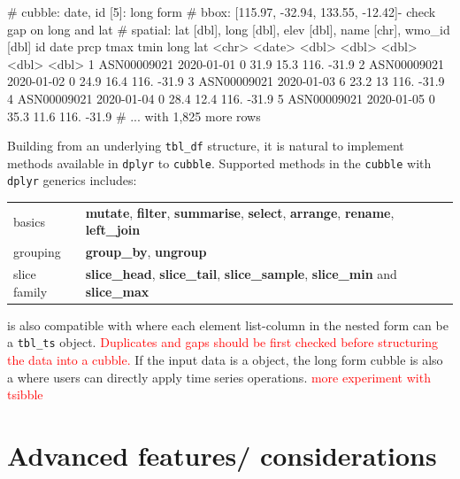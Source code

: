 \documentclass[
]{jss}
\begin{document}
\begin{CodeChunk}
\begin{CodeOutput}
# cubble:  date, id [5]: long form
# bbox:    [115.97, -32.94, 133.55, -12.42]- check gap on long and lat
# spatial: lat [dbl], long [dbl], elev [dbl], name [chr], wmo_id [dbl]
  id          date        prcp  tmax  tmin  long   lat
  <chr>       <date>     <dbl> <dbl> <dbl> <dbl> <dbl>
1 ASN00009021 2020-01-01     0  31.9  15.3  116. -31.9
2 ASN00009021 2020-01-02     0  24.9  16.4  116. -31.9
3 ASN00009021 2020-01-03     6  23.2  13    116. -31.9
4 ASN00009021 2020-01-04     0  28.4  12.4  116. -31.9
5 ASN00009021 2020-01-05     0  35.3  11.6  116. -31.9
# ... with 1,825 more rows
\end{CodeOutput}
\end{CodeChunk}

Building from an underlying \texttt{tbl\_df} structure, it is natural to
implement methods available in \texttt{dplyr} to \texttt{cubble}.
Supported methods in the \texttt{cubble} with \texttt{dplyr} generics
includes:

\begin{center}
\begin{tabular}{ | m{5em} | m{15cm}| } 
basics & \textbf{mutate}, \textbf{filter}, \textbf{summarise}, \textbf{select}, \textbf{arrange}, \textbf{rename}, \textbf{left\_join} \\
grouping &  \textbf{group\_by}, \textbf{ungroup}\\
slice family & \textbf{slice\_head}, \textbf{slice\_tail}, \textbf{slice\_sample}, \textbf{slice\_min} and \textbf{slice\_max} \\
\end{tabular}
\end{center}

 is also compatible with  where each element
list-column in the nested form can be a \texttt{tbl\_ts} object.
\textcolor{red}{Duplicates and gaps should be first checked before structuring the data into a cubble.}
If the input data is a  object, the long form cubble is
also a  where users can directly apply time series
operations. \textcolor{red}{more experiment with tsibble}

\newpage

\hypertarget{advanced-features-considerations}{%
\section{Advanced features/
considerations}\label{advanced-features-considerations}}
\end{document}
